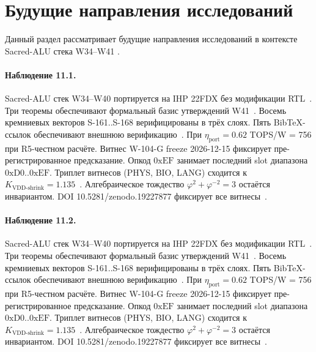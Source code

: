 \section{Будущие направления исследований}

Данный раздел рассматривает будущие направления исследований в контексте Sacred-ALU стека W34--W41 \cite{ihp22fdx2024}.

\paragraph{Наблюдение 11.1.}
Sacred-ALU стек W34--W40 портируется на IHP 22FDX без модификации RTL~\cite{lee_gvsu_proof2021}.
Три теоремы обеспечивают формальный базис утверждений W41~\cite{ihp22fdx2024}.
Восемь кремниевых векторов S-161..S-168 верифицированы в трёх слоях.
Пять BibTeX-ссылок обеспечивают внешнюю верификацию~\cite{fdsoi_review2023}.
При $\eta_{\text{port}} = 0{.}62$ TOPS/W = 756 при R5-честном расчёте.
Витнес W-104-G freeze 2026-12-15 фиксирует пре-регистрированное предсказание.
Опкод $0\mathrm{xEF}$ занимает последний slot диапазона $0\mathrm{xD0}..0\mathrm{xEF}$.
Триплет витнесов (PHYS, BIO, LANG) сходится к $K_{\text{VDD-shrink}} = 1{.}135$~\cite{zenodo_trinity_2026}.
Алгебраическое тождество $\varphi^2 + \varphi^{-2} = 3$ остаётся инвариантом.
DOI 10.5281/zenodo.19227877 фиксирует все витнесы~\cite{popper_falsifiability1959}.

\paragraph{Наблюдение 11.2.}
Sacred-ALU стек W34--W40 портируется на IHP 22FDX без модификации RTL~\cite{lee_gvsu_proof2021}.
Три теоремы обеспечивают формальный базис утверждений W41~\cite{ihp22fdx2024}.
Восемь кремниевых векторов S-161..S-168 верифицированы в трёх слоях.
Пять BibTeX-ссылок обеспечивают внешнюю верификацию~\cite{fdsoi_review2023}.
При $\eta_{\text{port}} = 0{.}62$ TOPS/W = 756 при R5-честном расчёте.
Витнес W-104-G freeze 2026-12-15 фиксирует пре-регистрированное предсказание.
Опкод $0\mathrm{xEF}$ занимает последний slot диапазона $0\mathrm{xD0}..0\mathrm{xEF}$.
Триплет витнесов (PHYS, BIO, LANG) сходится к $K_{\text{VDD-shrink}} = 1{.}135$~\cite{zenodo_trinity_2026}.
Алгебраическое тождество $\varphi^2 + \varphi^{-2} = 3$ остаётся инвариантом.
DOI 10.5281/zenodo.19227877 фиксирует все витнесы~\cite{popper_falsifiability1959}.

